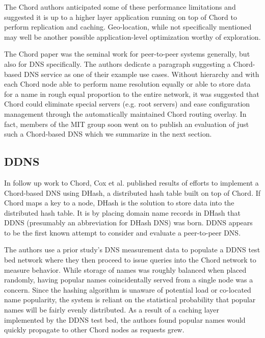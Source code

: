 \documentclass[sigconf]{acmart}
\begin{document}
The Chord authors anticipated some of these performance limitations and
suggested it is up to a higher layer application running on top of Chord
to perform replication and caching.  Geo-location, while not specifically
mentioned may well be another possible application-level optimization
worthy of exploration.

The Chord paper was the seminal work for peer-to-peer systems generally,
but also for DNS specifically.  The authors dedicate a paragraph
suggesting a Chord-based DNS service as one of their example use cases.
Without hierarchy and with each Chord node able to perform name
resolution equally or able to store data for a name in rough equal
proportion to the entire network, it was suggested that Chord could
eliminate special servers (e.g. root servers) and ease configuration
management through the automatically maintained Chord routing overlay.
In fact, members of the MIT group soon went on to publish an evaluation
of just such a Chord-based DNS which we summarize in the next section.

\subsection{DDNS}

In follow up work to Chord, Cox et al. published results of efforts to
implement a Chord-based DNS using DHash, a distributed hash table built
on top of Chord.\cite{dabek_building_2001}  If Chord maps a key to a
node, DHash is the solution to store data into the distributed hash
table.  It is by placing domain name records in DHash that DDNS
(presumably an abbreviation for DHash DNS) was born.  DDNS appears to be
the first known attempt to consider and evaluate a peer-to-peer DNS.

The authors use a prior study's DNS measurement data to populate a DDNS
test bed network where they then proceed to issue queries into the Chord
network to measure behavior.\cite{jung_dns_2002}  While storage of names
was roughly balanced when placed randomly, having popular names
coincidentally served from a single node was a concern.  Since the
hashing algorithm is unaware of potential load or co-located name
popularity, the system is reliant on the statistical probability that
popular names will be fairly evenly distributed.  As a result of a
caching layer implemented by the DDNS test bed, the authors found popular
names would quickly propagate to other Chord nodes as requests grew.
\end{document}
